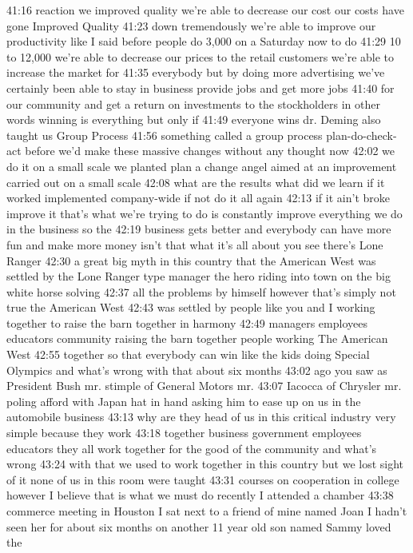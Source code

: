\documentclass[
]{book}
\begin{document}
41:16
reaction we improved quality we're able to decrease our cost our costs have gone
Improved Quality
41:23
down tremendously we're able to improve our productivity like I said before people do 3,000 on a Saturday now to do
41:29
10 to 12,000 we're able to decrease our prices to the retail customers we're able to increase the market for
41:35
everybody but by doing more advertising we've certainly been able to stay in business provide jobs and get more jobs
41:40
for our community and get a return on investments to the stockholders in other words winning is everything but only if
41:49
everyone wins dr. Deming also taught us
Group Process
41:56
something called a group process plan-do-check-act before we'd make these massive changes without any thought now
42:02
we do it on a small scale we planted plan a change angel aimed at an improvement carried out on a small scale
42:08
what are the results what did we learn if it worked implemented company-wide if not do it all again
42:13
if it ain't broke improve it that's what we're trying to do is constantly improve everything we do in the business so the
42:19
business gets better and everybody can have more fun and make more money isn't that what it's all about you see there's
Lone Ranger
42:30
a great big myth in this country that the American West was settled by the Lone Ranger type manager the hero riding into town on the big white horse solving
42:37
all the problems by himself however that's simply not true the American West
42:43
was settled by people like you and I working together to raise the barn together in harmony
42:49
managers employees educators community raising the barn together people working
The American West
42:55
together so that everybody can win like the kids doing Special Olympics and what's wrong with that about six months
43:02
ago you saw as President Bush mr. stimple of General Motors mr.
43:07
Iacocca of Chrysler mr. poling afford with Japan hat in hand asking him to ease up on us in the automobile business
43:13
why are they head of us in this critical industry very simple because they work
43:18
together business government employees educators they all work together for the good of the community and what's wrong
43:24
with that we used to work together in this country but we lost sight of it none of us in this room were taught
43:31
courses on cooperation in college however I believe that is what we must do recently I attended a chamber
43:38
commerce meeting in Houston I sat next to a friend of mine named Joan I hadn't seen her for about six months on another 11 year old son named Sammy loved the
\end{document}
